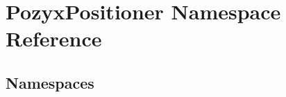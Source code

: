 \hypertarget{namespace_pozyx_positioner}{}\section{Pozyx\+Positioner Namespace Reference}
\label{namespace_pozyx_positioner}
\subsection*{Namespaces}
\begin{DoxyCompactItemize}
\end{DoxyCompactItemize}
